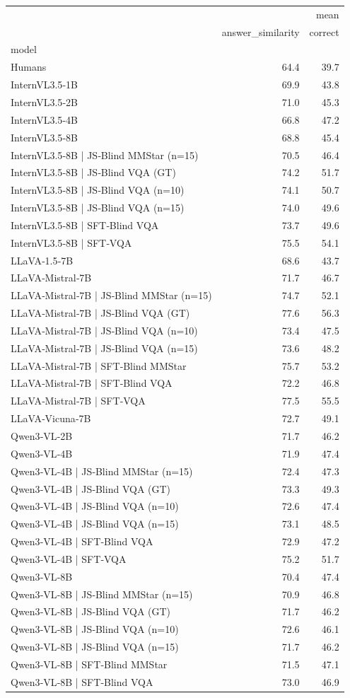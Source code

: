 \begin{tabular}{lrr}
\toprule
 & \multicolumn{2}{r}{mean} \\
 & answer_similarity & correct \\
model &  &  \\
\midrule
Humans & 64.4 & 39.7 \\
InternVL3.5‑1B & 69.9 & 43.8 \\
InternVL3.5‑2B & 71.0 & 45.3 \\
InternVL3.5‑4B & 66.8 & 47.2 \\
InternVL3.5‑8B & 68.8 & 45.4 \\
InternVL3.5‑8B | JS‑Blind MMStar (n=15) & 70.5 & 46.4 \\
InternVL3.5‑8B | JS‑Blind VQA (GT) & 74.2 & 51.7 \\
InternVL3.5‑8B | JS‑Blind VQA (n=10) & 74.1 & 50.7 \\
InternVL3.5‑8B | JS‑Blind VQA (n=15) & 74.0 & 49.6 \\
InternVL3.5‑8B | SFT‑Blind VQA & 73.7 & 49.6 \\
InternVL3.5‑8B | SFT‑VQA & 75.5 & 54.1 \\
LLaVA‑1.5‑7B & 68.6 & 43.7 \\
LLaVA‑Mistral‑7B & 71.7 & 46.7 \\
LLaVA‑Mistral‑7B | JS‑Blind MMStar (n=15) & 74.7 & 52.1 \\
LLaVA‑Mistral‑7B | JS‑Blind VQA (GT) & 77.6 & 56.3 \\
LLaVA‑Mistral‑7B | JS‑Blind VQA (n=10) & 73.4 & 47.5 \\
LLaVA‑Mistral‑7B | JS‑Blind VQA (n=15) & 73.6 & 48.2 \\
LLaVA‑Mistral‑7B | SFT‑Blind MMStar & 75.7 & 53.2 \\
LLaVA‑Mistral‑7B | SFT‑Blind VQA & 72.2 & 46.8 \\
LLaVA‑Mistral‑7B | SFT‑VQA & 77.5 & 55.5 \\
LLaVA‑Vicuna‑7B & 72.7 & 49.1 \\
Qwen3‑VL‑2B & 71.7 & 46.2 \\
Qwen3‑VL‑4B & 71.9 & 47.4 \\
Qwen3‑VL‑4B | JS‑Blind MMStar (n=15) & 72.4 & 47.3 \\
Qwen3‑VL‑4B | JS‑Blind VQA (GT) & 73.3 & 49.3 \\
Qwen3‑VL‑4B | JS‑Blind VQA (n=10) & 72.6 & 47.4 \\
Qwen3‑VL‑4B | JS‑Blind VQA (n=15) & 73.1 & 48.5 \\
Qwen3‑VL‑4B | SFT‑Blind VQA & 72.9 & 47.2 \\
Qwen3‑VL‑4B | SFT‑VQA & 75.2 & 51.7 \\
Qwen3‑VL‑8B & 70.4 & 47.4 \\
Qwen3‑VL‑8B | JS‑Blind MMStar (n=15) & 70.9 & 46.8 \\
Qwen3‑VL‑8B | JS‑Blind VQA (GT) & 71.7 & 46.2 \\
Qwen3‑VL‑8B | JS‑Blind VQA (n=10) & 72.6 & 46.1 \\
Qwen3‑VL‑8B | JS‑Blind VQA (n=15) & 71.7 & 46.2 \\
Qwen3‑VL‑8B | SFT‑Blind MMStar & 71.5 & 47.1 \\
Qwen3‑VL‑8B | SFT‑Blind VQA & 73.0 & 46.9 \\
\bottomrule
\end{tabular}
